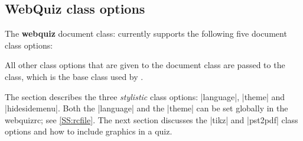 \documentclass[svgnames]{article}
\newcommand\webquizrc{\index{webquizrc}\textsf{webquizrc}\xspace}
\begin{document}
\subsection{WebQuiz class options}
\label{SS:classOptions}

The \textbf{webquiz} document class: currently supports the following
five document class options:


    All other class options that are given to the \WebQuiz document class
    are passed to the  class, which is the base class used
    by .

    The section describes the three \textit{stylistic} class options:
    \LatexCode|language|, \LatexCode|theme| and \LatexCode|hidesidemenu|.
    Both the \LatexCode|language| and the \LatexCode|theme| can be set globally in
    the \webquizrc; see \autoref{SS:rcfile}.
    The next section discusses the \LatexCode|tikz| and \LatexCode|pst2pdf| class
    options and how to include graphics in a quiz.
\end{document}
